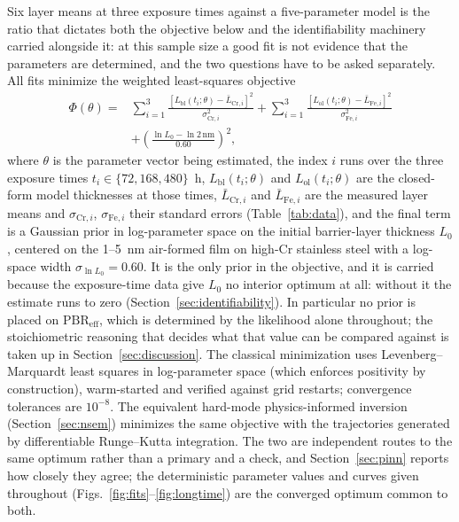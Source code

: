 \documentclass[a4paper,fleqn]{cas-sc}
\begin{document}
Six layer means at three exposure times against a five-parameter model
is the ratio that dictates both the objective below and the
identifiability machinery carried alongside it: at this sample size a
good fit is not evidence that the parameters are determined, and the
two questions have to be asked separately. All fits minimize the
weighted least-squares objective
\begin{equation}
\begin{split}
\Phi(\theta) = {}&
\sum_{i=1}^{3} \frac{\left[L_\text{bl}(t_i;\theta) - \bar{L}_{\text{Cr},i}\right]^2}{\sigma_{\text{Cr},i}^2}
+ \sum_{i=1}^{3} \frac{\left[L_\text{ol}(t_i;\theta) - \bar{L}_{\text{Fe},i}\right]^2}{\sigma_{\text{Fe},i}^2} \\
&+ \left(\frac{\ln L_0 - \ln 2\,\text{nm}}{0.60}\right)^{\!2},
\end{split}
\label{eq:objective}
\end{equation}
where $\theta$ is the parameter vector being estimated, the index $i$
runs over the three exposure times $t_i \in \{72, 168, 480\}$~h,
$L_\text{bl}(t_i;\theta)$ and $L_\text{ol}(t_i;\theta)$ are the
closed-form model thicknesses at those times,
$\bar{L}_{\text{Cr},i}$ and $\bar{L}_{\text{Fe},i}$ are the measured
layer means and $\sigma_{\text{Cr},i}$, $\sigma_{\text{Fe},i}$ their
standard errors (Table~\ref{tab:data}), and the final term is a
Gaussian prior in log-parameter space on the initial barrier-layer
thickness $L_0$, centered on the 1--5~nm air-formed film on high-Cr
stainless steel with a log-space width $\sigma_{\ln L_0} = 0.60$. It is the only
prior in the objective, and it is carried because the exposure-time data
give $L_0$ no interior optimum at all: without it the estimate runs to
zero (Section~\ref{sec:identifiability}). In particular no prior is placed on
$\mathrm{PBR}_\text{eff}$, which is determined by the likelihood alone
throughout; the stoichiometric reasoning that decides what that value
can be compared against is taken up in Section~\ref{sec:discussion}.
The classical minimization
uses Levenberg--Marquardt least squares in log-parameter space (which
enforces positivity by construction), warm-started and verified against
grid restarts; convergence tolerances are $10^{-8}$. The equivalent
hard-mode physics-informed inversion (Section~\ref{sec:nsem}) minimizes
the same objective with the trajectories generated by differentiable
Runge--Kutta integration. The two are independent routes to the same
optimum rather than a primary and a check, and Section~\ref{sec:pinn}
reports how closely they agree; the deterministic parameter values and
curves given throughout
(Figs.~\ref{fig:fits}--\ref{fig:longtime}) are the converged optimum
common to both.
\end{document}
